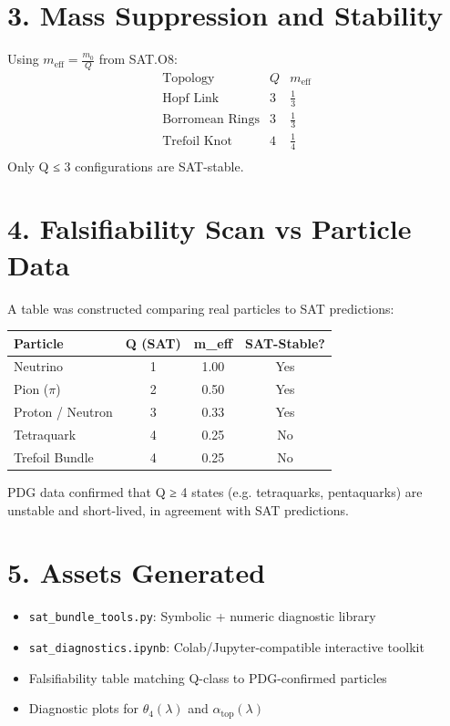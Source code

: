 \documentclass{article}
\begin{document}
\section*{3. Mass Suppression and Stability}

Using $m_{\mathrm{eff}} = \frac{m_0}{Q}$ from SAT.O8:
\[
\begin{array}{l|c|c}
\text{Topology} & Q & m_{\mathrm{eff}} \\ \hline
\text{Hopf Link} & 3 & \frac{1}{3} \\
\text{Borromean Rings} & 3 & \frac{1}{3} \\
\text{Trefoil Knot} & 4 & \frac{1}{4} \\
\end{array}
\]
Only Q ≤ 3 configurations are SAT-stable.

\section*{4. Falsifiability Scan vs Particle Data}

A table was constructed comparing real particles to SAT predictions:

\begin{tabular}{l|c|c|c}
\textbf{Particle} & \textbf{Q (SAT)} & \textbf{m\_eff} & \textbf{SAT-Stable?} \\
\hline
Neutrino & 1 & 1.00 & Yes \\
Pion ($\pi$) & 2 & 0.50 & Yes \\
Proton / Neutron & 3 & 0.33 & Yes \\
Tetraquark & 4 & 0.25 & No \\
Trefoil Bundle & 4 & 0.25 & No \\
\end{tabular}

PDG data confirmed that Q ≥ 4 states (e.g. tetraquarks, pentaquarks) are unstable and short-lived, in agreement with SAT predictions.

\section*{5. Assets Generated}

\begin{itemize}
    \item \texttt{sat\_bundle\_tools.py}: Symbolic + numeric diagnostic library
    \item \texttt{sat\_diagnostics.ipynb}: Colab/Jupyter-compatible interactive toolkit
    \item Falsifiability table matching Q-class to PDG-confirmed particles
    \item Diagnostic plots for $\theta_4(\lambda)$ and $\alpha_{\mathrm{top}}(\lambda)$
\end{itemize}
\end{document}
